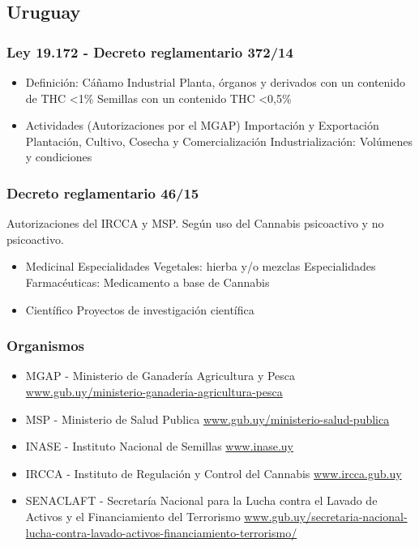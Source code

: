 \documentclass{article}
\begin{document}
\newpage

\subsection{Uruguay}

\subsubsection{Ley 19.172 - Decreto reglamentario 372/14}

\begin{itemize}
	\item Definición: Cáñamo Industrial
	\subitem Planta, órganos y derivados con un contenido de THC \textless 1\%
	\subitem Semillas con un contenido THC \textless 0,5\%
	\item Actividades (Autorizaciones por el MGAP)
	\subitem Importación y Exportación
	\subitem Plantación, Cultivo, Cosecha y Comercialización
	\subitem Industrialización: Volúmenes y condiciones
\end{itemize}

\subsubsection{Decreto reglamentario 46/15}
Autorizaciones del IRCCA y MSP. Según uso del Cannabis psicoactivo y no psicoactivo.

\begin{itemize}
	\item Medicinal
	\subitem Especialidades Vegetales: hierba y/o mezclas
	\subitem Especialidades Farmacéuticas: Medicamento a base de Cannabis
	\item Científico
	\subitem Proyectos de investigación científica
\end{itemize}

\subsubsection{Organismos}

\begin{itemize}
	\item MGAP - Ministerio de Ganadería Agricultura y Pesca
	\subitem \url{www.gub.uy/ministerio-ganaderia-agricultura-pesca}
	\item MSP - Ministerio de Salud Publica
	\subitem \url{www.gub.uy/ministerio-salud-publica}
	\item INASE - Instituto Nacional de Semillas
	\subitem \url{www.inase.uy}
	\item IRCCA - Instituto de Regulación y Control del Cannabis
	\subitem \url{www.ircca.gub.uy}
	\item SENACLAFT - Secretaría Nacional para la Lucha contra el Lavado de Activos y el Financiamiento del Terrorismo
	\subitem \url{www.gub.uy/secretaria-nacional-lucha-contra-lavado-activos-financiamiento-terrorismo/}
\end{itemize}
\end{document}
